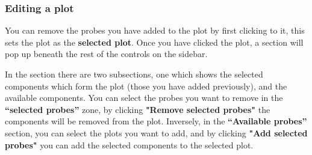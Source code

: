 \subsubsection{Editing a plot}
    You can remove the probes you have added to the plot by first clicking to it, this sets the plot as the \textbf{selected plot}. Once you have clicked the plot, a section will pop up beneath the rest of the controls on the sidebar. 
        

    In the section there are two subsections, one which shows the selected components which form the plot (those you have added previously), and the available components. You can select the probes you want to remove in the \textbf{``selected probes''} zone, by clicking \textbf{"Remove selected probes"} the components will be removed from the plot. Inversely, in the \textbf{``Available probes''} section, you can select the plots you want to add, and by clicking \textbf{"Add selected probes"} you can add the selected components to the selected plot.

